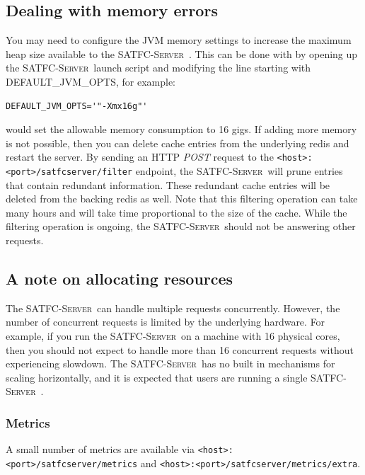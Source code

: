 \documentclass[
10pt, %
letterpaper, %
oneside, %
headinclude,footinclude, %
BCOR5mm, %
needspace, %
]{scrartcl}
\newcommand{\SATFCServer}{\textsc{SATFC-Server}~}
\begin{document}
\subsection{Dealing with memory errors}
You may need to configure the JVM memory settings to increase the maximum heap size available to the \SATFCServer. This can be done with by opening up the \SATFCServer launch script and modifying the line starting with DEFAULT\_JVM\_OPTS, for example:
\begin{lstlisting}[style=Bash]
DEFAULT_JVM_OPTS='"-Xmx16g"'
\end{lstlisting}
would set the allowable memory consumption to 16 gigs. If adding more memory is not possible, then you can delete cache entries from the underlying redis and restart the server. By sending an HTTP \emph{POST} request to the \texttt{<host>:<port>/satfcserver/filter} endpoint, the \SATFCServer will prune entries that contain redundant information. These redundant cache entries will be deleted from the backing redis as well. Note that this filtering operation can take many hours and will take time proportional to the size of the cache. While the filtering operation is ongoing, the \SATFCServer should not be answering other requests.

\subsection{A note on allocating resources}
The \SATFCServer can handle multiple requests concurrently. However, the number of concurrent requests is limited by the underlying hardware. For example, if you run the \SATFCServer on a machine with 16 physical cores, then you should not expect to handle more than 16 concurrent requests without experiencing slowdown. The \SATFCServer has no built in mechanisms for scaling horizontally, and it is expected that users are running a single \SATFCServer. 

\subsubsection{Metrics}
A small number of metrics are available via \texttt{<host>:<port>/satfcserver/metrics} and \texttt{<host>:<port>/satfcserver/metrics/extra}.
\end{document}
